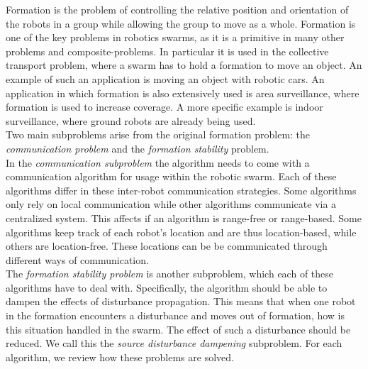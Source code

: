 
Formation is the problem of controlling the relative position and orientation of the robots in a group while allowing the group to move as a whole. \cite{consolini2008leader}
Formation is one of the key problems in robotics swarms, as it is a primitive in many other problems and composite-problems.
In particular it is used in the collective transport problem, where a swarm has to hold a formation to move an object. 
An example of such an application is moving an object with robotic cars. \cite{mas2012object}
An application in which formation is also extensively used is area surveillance, where formation is used to increase coverage. \cite{burkle2011towards}
A more specific example is indoor surveillance, where ground robots are already being used. \cite{di2010autonomous, rybski2000team}
\\

Two main subproblems arise from the original formation problem: the \emph{communication problem} and the \emph{formation stability} problem.\\
In the \emph{communication subproblem} the algorithm needs to come with a communication algorithm for usage within the robotic swarm. 
Each of these algorithms differ in these inter-robot communication strategies. 
Some algorithms only rely on local communication while other algorithms communicate via a centralized system.
This affects if an algorithm is range-free or range-based. 
Some algorithms keep track of each robot's location and are thus location-based, while others are location-free.
These locations can be be communicated through different ways of communication. \\

The \emph{formation stability problem} is another subproblem, which each of these algorithms have to deal with.
Specifically, the algorithm should be able to dampen the effects of disturbance propagation. 
This means that when one robot in the formation encounters a disturbance and moves out of formation, how is this situation handled in the swarm. 
The effect of such a disturbance should be reduced.
We call this the \emph{source disturbance dampening} subproblem. 
For each algorithm, we review how these problems are solved.


